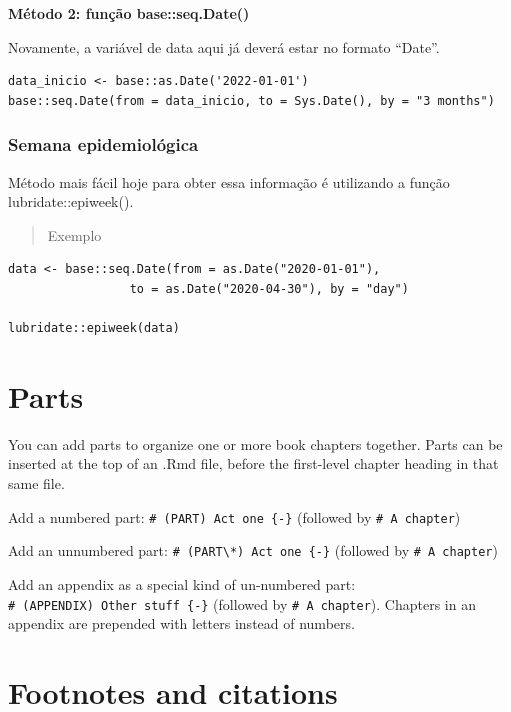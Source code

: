 \documentclass[
]{book}
\theoremstyle{definition}
\theoremstyle{definition}
\theoremstyle{definition}
\theoremstyle{definition}
\theoremstyle{remark}
\begin{document}
\textbf{Método 2: função base::seq.Date()}

Novamente, a variável de data aqui já deverá estar no formato ``Date''.

\begin{verbatim}
data_inicio <- base::as.Date('2022-01-01')
base::seq.Date(from = data_inicio, to = Sys.Date(), by = "3 months")
\end{verbatim}

\hypertarget{semana-epidemioluxf3gica}{%
\subsection{Semana epidemiológica}\label{semana-epidemioluxf3gica}}

Método mais fácil hoje para obter essa informação é utilizando a função lubridate::epiweek().

\begin{quote}
Exemplo
\end{quote}

\begin{verbatim}
data <- base::seq.Date(from = as.Date("2020-01-01"),
                 to = as.Date("2020-04-30"), by = "day")

lubridate::epiweek(data)
\end{verbatim}

\hypertarget{parts}{%
\chapter{Parts}\label{parts}}

You can add parts to organize one or more book chapters together. Parts can be inserted at the top of an .Rmd file, before the first-level chapter heading in that same file.

Add a numbered part: \texttt{\#\ (PART)\ Act\ one\ \{-\}} (followed by \texttt{\#\ A\ chapter})

Add an unnumbered part: \texttt{\#\ (PART\textbackslash{}*)\ Act\ one\ \{-\}} (followed by \texttt{\#\ A\ chapter})

Add an appendix as a special kind of un-numbered part: \texttt{\#\ (APPENDIX)\ Other\ stuff\ \{-\}} (followed by \texttt{\#\ A\ chapter}). Chapters in an appendix are prepended with letters instead of numbers.

\hypertarget{footnotes-and-citations}{%
\chapter{Footnotes and citations}\label{footnotes-and-citations}}
\end{document}

